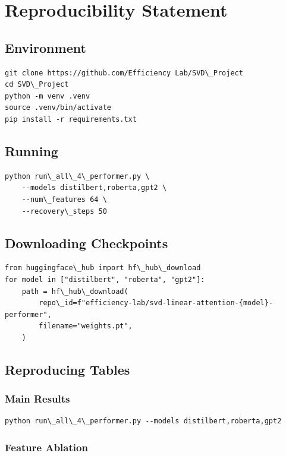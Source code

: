 
\section{Reproducibility Statement}

\subsection{Environment}

\begin{lstlisting}
git clone https://github.com/Efficiency Lab/SVD\_Project
cd SVD\_Project
python -m venv .venv
source .venv/bin/activate
pip install -r requirements.txt
\end{lstlisting}

\subsection{Running}

\begin{lstlisting}
python run\_all\_4\_performer.py \
    --models distilbert,roberta,gpt2 \
    --num\_features 64 \
    --recovery\_steps 50
\end{lstlisting}

\subsection{Downloading Checkpoints}

\begin{lstlisting}
from huggingface\_hub import hf\_hub\_download
for model in ["distilbert", "roberta", "gpt2"]:
    path = hf\_hub\_download(
        repo\_id=f"efficiency-lab/svd-linear-attention-{model}-performer",
        filename="weights.pt",
    )
\end{lstlisting}

\subsection{Reproducing Tables}

\subsubsection{Main Results}

\begin{lstlisting}
python run\_all\_4\_performer.py --models distilbert,roberta,gpt2
\end{lstlisting}

\subsubsection{Feature Ablation}

